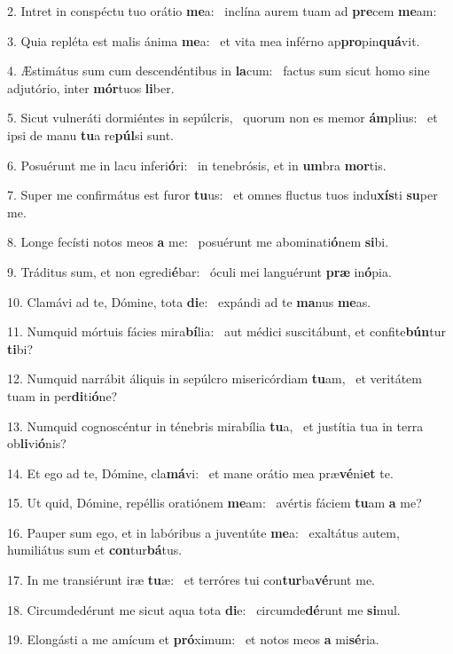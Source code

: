 2. Intret in conspéctu tuo orátio \textbf{me}a: \ast\  inclína aurem tuam ad \textbf{pre}cem \textbf{me}am:\

3. Quia repléta est malis ánima \textbf{me}a: \ast\  et vita mea inférno ap\textbf{pro}pin\textbf{quá}vit.\

4. Æstimátus sum cum descendéntibus in \textbf{la}cum: \ast\  factus sum sicut homo sine adjutório, inter \textbf{mór}tuos \textbf{li}ber.\

5. Sicut vulneráti dormiéntes in sepúlcris, \dag\  quorum non es memor \textbf{ám}plius: \ast\  et ipsi de manu \textbf{tu}a re\textbf{púl}si sunt.\

6. Posuérunt me in lacu inferi\textbf{ó}ri: \ast\  in tenebrósis, et in \textbf{um}bra \textbf{mor}tis.\

7. Super me confirmátus est furor \textbf{tu}us: \ast\  et omnes fluctus tuos indu\textbf{xís}ti \textbf{su}per me.\

8. Longe fecísti notos meos \textbf{a} me: \ast\  posuérunt me abominati\textbf{ó}nem \textbf{si}bi.\

9. Tráditus sum, et non egredi\textbf{é}bar: \ast\  óculi mei languérunt \textbf{præ} in\textbf{ó}pia.\

10. Clamávi ad te, Dómine, tota \textbf{di}e: \ast\  expándi ad te \textbf{ma}nus \textbf{me}as.\

11. Numquid mórtuis fácies mira\textbf{bí}lia: \ast\  aut médici suscitábunt, et confite\textbf{bún}tur \textbf{ti}bi?\

12. Numquid narrábit áliquis in sepúlcro misericórdiam \textbf{tu}am, \ast\  et veritátem tuam in per\textbf{di}ti\textbf{ó}ne?\

13. Numquid cognoscéntur in ténebris mirabília \textbf{tu}a, \ast\  et justítia tua in terra ob\textbf{li}vi\textbf{ó}nis?\

14. Et ego ad te, Dómine, cla\textbf{má}vi: \ast\  et mane orátio mea præ\textbf{vé}ni\textbf{et} te.\

15. Ut quid, Dómine, repéllis oratiónem \textbf{me}am: \ast\  avértis fáciem \textbf{tu}am \textbf{a} me?\

16. Pauper sum ego, et in labóribus a juventúte \textbf{me}a: \ast\  exaltátus autem, humiliátus sum et \textbf{con}tur\textbf{bá}tus.\

17. In me transiérunt iræ \textbf{tu}æ: \ast\  et terróres tui con\textbf{tur}ba\textbf{vé}runt me.\

18. Circumdedérunt me sicut aqua tota \textbf{di}e: \ast\  circumde\textbf{dé}runt me \textbf{si}mul.\

19. Elongásti a me amícum et \textbf{pró}ximum: \ast\  et notos meos \textbf{a} mi\textbf{sé}ria.\

